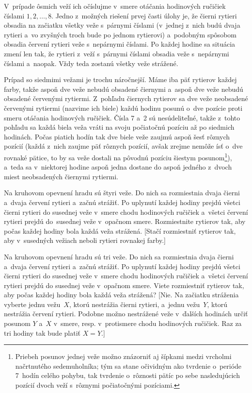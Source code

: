 {%
V~prípade ôsmich veží ich očíslujme v~smere otáčania hodinových ručičiek
číslami $1, 2, \dots, 8$. Jedno z~možných riešení prvej časti úlohy je, že
čierni rytieri obsadia na začiatku všetky veže s~párnymi číslami
(v~jednej z~nich budú dvaja rytieri a~vo zvyšných troch bude po jednom rytierovi)
a~podobným spôsobom obsadia červení rytieri veže s~nepárnymi číslami.
Po každej hodine sa situácia zmení len tak, že rytieri z~veží
s~párnymi číslami obsadia veže s~nepárnymi číslami a~naopak.
Vždy teda zostanú všetky veže strážené.

Prípad so siedmimi vežami je trochu náročnejší. Máme iba päť rytierov
každej farby, takže aspoň dve veže nebudú obsadené čiernymi a~aspoň dve
veže nebudú obsadené červenými rytiermi. Z~pohľadu čiernych rytierov sa
dve veže neobsadené červenými rytiermi (nazvime ich biele) každú hodinu
posunú o~dve pozície proti smeru otáčania hodinových ručičiek. Čísla 7 a~2 sú
nesúdeliteľné, takže z~tohto pohľadu sa každá biela veža vráti na svoju počiatočnú
pozíciu až po siedmich hodinách. Počas piatich hodín tak dve biele veže zaujmú
aspoň šesť rôznych pozícií (každá z~nich zaujme päť rôznych pozícií,
avšak zrejme nemôže ísť o~dve rovnaké pätice, to by sa veže dostali
na pôvodnú pozíciu šiestym posunom\footnote{Priebeh posunov jednej veže možno
znázorniť aj šípkami medzi vrcholmi načrtnutého sedemuholníka;
tým sa stane očividným ako tvrdenie o~perióde 7~hodín celého pohybu,
tak tvrdenie o~rôznosti pätíc po sebe nasledujúcich pozícií dvoch veží
s~rôznymi počiatočnými pozíciami.}), a~teda sa v~niektorej hodine aspoň jedna
dostane do aspoň jedného z~dvoch miest neobsadených čiernymi rytiermi.

Na kruhovom opevnení hradu sú štyri veže. Do nich sa rozmiestnia dvaja
čierni a~dvaja červení rytieri a~začnú strážiť. Po uplynutí každej
hodiny prejdú všetci čierni rytieri do susednej veže v~smere chodu
hodinových ručičiek a~všetci červení rytieri prejdú do~susednej veže
v~opačnom smere. Rozmiestnite rytierov tak, aby počas každej hodiny bola
každá veža strážená. [Stačí rozmiestniť rytierov tak, aby v~susedných
vežiach neboli rytieri rovnakej farby.]

Na kruhovom opevnení hradu sú tri veže. Do nich sa rozmiestnia dvaja
čierni a~dvaja červení rytieri a~začnú strážiť. Po uplynutí každej
hodiny prejdú všetci čierni rytieri do susednej veže v~smere chodu
hodinových ručičiek a~všetci červení rytieri prejdú do susednej veže
v~opačnom smere. Viete rozmiestniť rytierov tak, aby počas každej hodiny
bola každá veža strážená? [Nie. Na začiatku stráženia vyberte jednu vežu~$X$,
ktorú nestrážia čierni rytieri, a~jednu vežu~$Y$, ktorú nestrážia červení
rytieri. Podobne možno nestrážené veže v~ďalších hodinách určiť posunom
$Y$ a~$X$ v~smere, resp. v~protismere chodu hodinových ručičiek.
Raz za tri hodiny tak bude platiť $X=Y$.]

}
